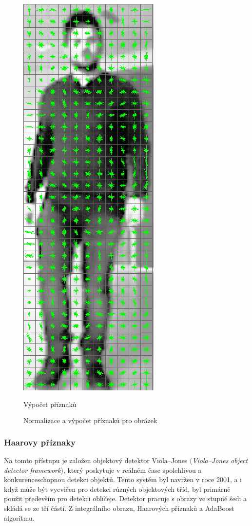 \begin{figure}[H]
\begin{minipage}{.3\textwidth}
  \includegraphics[width=.5\linewidth]{figures/features}
  \caption*{Výpočet příznaků}
  \label{fig:hog_features}
\end{minipage}
\caption{Normalizace a výpočet příznaků pro obrázek}
\label{fig:hogCalc}
\end{figure}

\subsubsection*{Haarovy příznaky}
Na tomto přístupu je založen objektový detektor Viola--Jones (\textit{Viola--Jones object detector framework}), který poskytuje v reálném čase spolehlivou a konkurenceschopnou detekci objektů. Tento systém byl navržen v roce 2001, a i když může být vycvičen pro detekci různých objektových tříd, byl primárně použit především pro detekci obličeje. Detektor pracuje s obrazy ve stupně šedi a skládá se ze tří částí. Z integrálního obrazu, Haarových příznaků a AdaBoost algoritmu. 

